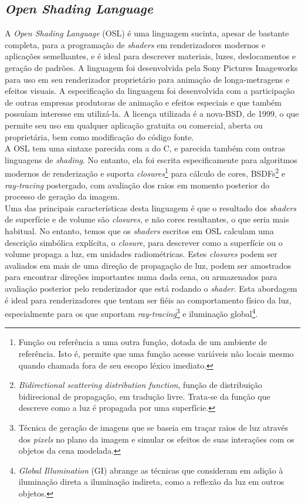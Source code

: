 \subsection{\emph{Open Shading Language}}
\label{osl}

A \emph{Open Shading Language} (OSL) é uma linguagem sucinta, apesar de bastante completa, para a programação de \emph{shaders} em renderizadores modernos e aplicações semelhantes, e é ideal para descrever materiais, luzes, deslocamentos e geração de padrões.
A linguagem foi desenvolvida pela Sony Pictures Imageworks para uso em seu renderizador proprietário para animação de longa-metragens e efeitos visuais. A especificação da linguagem foi desenvolvida com a participação de outras empresas produtoras de animação e efeitos especiais e que também possuíam interesse em utilizá-la.
A licença utilizada é a nova-BSD, de 1999, o que permite seu uso em qualquer aplicação gratuita ou comercial, aberta ou proprietária, bem como modificação do código fonte. \\

A OSL tem uma sintaxe parecida com a do C, e parecida também com outras linguagens de \emph{shading}. No entanto, ela foi escrita especificamente para algoritmos modernos de renderização e suporta \emph{closures}\footnote{Função ou referência a uma outra função, dotada de um ambiente de referência. Isto é, permite que uma função acesse variáveis não locais mesmo quando chamada fora de seu escopo léxico imediato.} para cálculo de cores, BSDFs\footnote{\emph{Bidirectional scattering distribution function}, função de distribuição bidirecional de propagação, em tradução livre. Trata-se da função que descreve como a luz é propagada por uma superfície.} e \emph{ray-tracing} postergado, com avaliação dos raios em momento posterior do processo de geração da imagem. \\

Uma das principais características desta linguagem é que o resultado dos \emph{shaders} de superfície e de volume são \emph{closures}, e não cores resultantes, o que seria mais habitual.
No entanto, temos que os \emph{shaders} escritos em OSL calculam uma descrição simbólica explícita, o \emph{closure}, para descrever como a superfície ou o volume propaga a luz, em unidades radiométricas. Estes \emph{closures} podem ser avaliados em mais de uma direção de propagação de luz, podem ser amostrados para encontrar direções importantes numa dada cena, ou armazenados para avaliação posterior pelo renderizador que está rodando o \emph{shader}. Esta abordagem é ideal para renderizadores que tentam ser fiéis ao comportamento físico da luz, especialmente para os que suportam \emph{ray-tracing}\footnote{Técnica de geração de imagens que se baseia em traçar raios de luz através dos \emph{pixels} no plano da imagem e simular os efeitos de suas interações com os objetos da cena modelada.} e iluminação global\footnote{\emph{Global Illumination} (GI) abrange as técnicas que consideram em adição à iluminação direta a iluminação indireta, como a reflexão da luz em outros objetos.}.


\begin{figure}[!htb]

\end{figure}